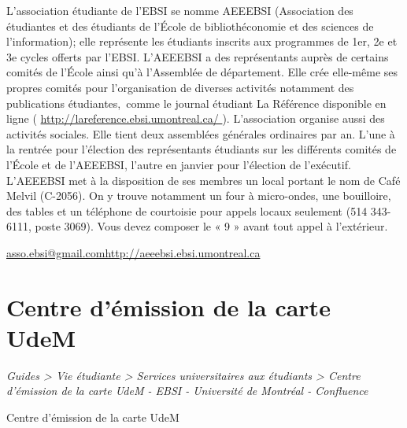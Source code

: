 \documentclass [12 pt]{article}
\begin{document}
            L'association étudiante de l'EBSI se nomme AEEEBSI (Association des étudiantes et des
                étudiants de l'École de bibliothéconomie et des sciences de l'information); elle
                représente les étudiants inscrits aux programmes de 1er, 2e et
                    3e cycles offerts par l'EBSI.
            L'AEEEBSI a des représentants auprès de certains comités de l'École ainsi qu'à
                l'Assemblée de département. Elle crée elle-même ses propres comités pour
                l'organisation de diverses activités notamment des publications
                étudiantes, comme le journal étudiant La Référence disponible en ligne
                    (
        \href{
        http://lareference.ebsi.umontreal.ca/
        } {
        http://lareference.ebsi.umontreal.ca/
        }
    ).
            L'association organise aussi des activités sociales. Elle tient deux assemblées
                générales ordinaires par an. L'une à la rentrée pour l'élection des représentants
                étudiants sur les différents comités de l'École et de l'AEEEBSI, l'autre en janvier
                pour l'élection de l'exécutif.
            L'AEEEBSI met à la disposition de ses membres un local portant le nom de Café Melvil
                (C-2056). On y trouve notamment un four à micro-ondes, une bouilloire, des tables et
                un téléphone de courtoisie pour appels locaux seulement (514 343-6111, poste 3069).
                Vous devez composer le « 9 » avant tout appel à l'extérieur.
            
                
                    
        \href{
        http://aeeebsi.ebsi.umontreal.ca
        } {
        asso.ebsi@gmail.comhttp://aeeebsi.ebsi.umontreal.ca
        }
    
                
            
        
    
    
        \newpage
        \section {
        Centre d'émission de la carte UdeM
        }
        
        
        
        \textit{
        Guides > Vie étudiante > Services universitaires aux étudiants > Centre
            d'émission de la carte UdeM - EBSI - Université de Montréal - Confluence
        }
    
        Centre d'émission de la carte UdeM
        
\end{document}

